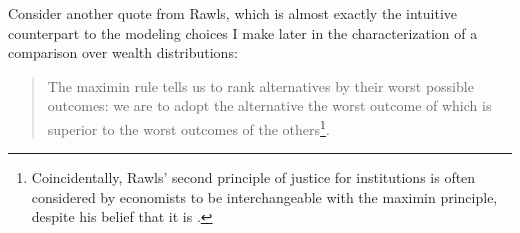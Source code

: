 \documentclass[Chp3.tex]{subfiles}
\begin{document}
\par Consider another quote from Rawls, which is almost exactly the intuitive counterpart to the modeling choices I make later in the characterization of a comparison over wealth distributions:

\begin{quote}

The maximin rule tells us to rank alternatives by their worst possible outcomes: we are to adopt the alternative the worst outcome of which is superior to the worst outcomes of the others\footnote{Coincidentally, Rawls' second principle of justice for institutions is often considered by economists to be interchangeable with the maximin principle, despite his belief that it is .}.

\end{quote}
\end{document}
